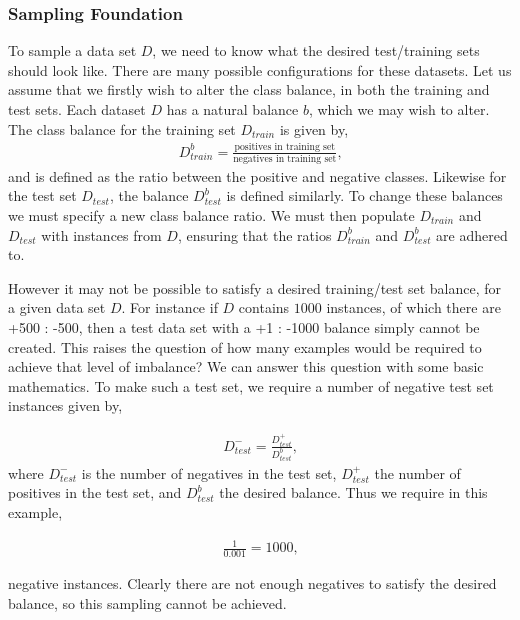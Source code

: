 \documentclass[twoside,a4paper]{refart}
\begin{document}
\subsubsection{Sampling Foundation}
To sample a data set $D$, we need to know what the desired test/training sets should look like. There are many possible configurations for these datasets. Let us assume that we firstly wish to alter the class balance, in both the training and test sets. Each dataset $D$ has a natural balance $b$, which we may wish to alter. The class balance for the training set $D_{train}$ is given by,
\begin{eqnarray*}
D_{train}^{b}=\frac{\textrm{positives in training set}}{\textrm{negatives in training set}} \textrm{,}
\end{eqnarray*}
and is defined as the ratio between the positive and negative classes. Likewise for the test set $D_{test}$, the balance $D_{test}^{b}$ is defined similarly. To change these balances we must specify a new class balance ratio. We must then populate $D_{train}$ and $D_{test}$ with instances from $D$, ensuring that the ratios $D_{train}^{b}$ and $D_{test}^{b}$ are adhered to. 

However it may not be possible to satisfy a desired training/test set balance, for a given data set $D$. For instance if $D$ contains $1000$ instances, of which there are +500 : -500, then a test data set with a +1 : -1000 balance simply cannot be created. This raises the question of how many examples would be required to achieve that level of imbalance? We can answer this question with some basic mathematics. To make such a test set, we require a number of negative test set instances given by,

\begin{eqnarray*}
D_{test}^{-}=\frac{D_{test}^{+}}{D_{test}^{b}}\textrm{,}
\end{eqnarray*} 
where $D_{test}^{-}$ is the number of negatives in the test set, $D_{test}^{+}$ the number of positives in the test set, and $D_{test}^{b}$ the desired balance. Thus we require in this example,

\begin{eqnarray*}
\frac{1}{0.001}=1000\textrm{,}
\end{eqnarray*}

negative instances. Clearly there are not enough negatives to satisfy the desired balance, so this sampling cannot be achieved.
\end{document}

